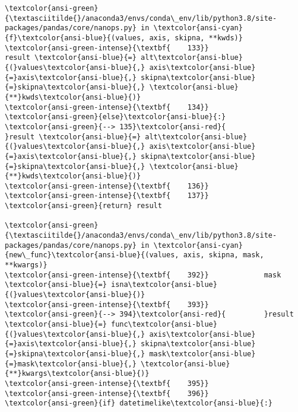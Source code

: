 \documentclass[11pt]{article}
\begin{document}
\begin{Verbatim}[commandchars=\\\{\}, frame=single, framerule=2mm, rulecolor=\color{outerrorbackground}]
\textcolor{ansi-green}{\textasciitilde{}/anaconda3/envs/conda\_env/lib/python3.8/site-packages/pandas/core/nanops.py} in \textcolor{ansi-cyan}{f}\textcolor{ansi-blue}{(values, axis, skipna, **kwds)}
\textcolor{ansi-green-intense}{\textbf{    133}}                     result \textcolor{ansi-blue}{=} alt\textcolor{ansi-blue}{(}values\textcolor{ansi-blue}{,} axis\textcolor{ansi-blue}{=}axis\textcolor{ansi-blue}{,} skipna\textcolor{ansi-blue}{=}skipna\textcolor{ansi-blue}{,} \textcolor{ansi-blue}{**}kwds\textcolor{ansi-blue}{)}
\textcolor{ansi-green-intense}{\textbf{    134}}             \textcolor{ansi-green}{else}\textcolor{ansi-blue}{:}
\textcolor{ansi-green}{--> 135}\textcolor{ansi-red}{                 }result \textcolor{ansi-blue}{=} alt\textcolor{ansi-blue}{(}values\textcolor{ansi-blue}{,} axis\textcolor{ansi-blue}{=}axis\textcolor{ansi-blue}{,} skipna\textcolor{ansi-blue}{=}skipna\textcolor{ansi-blue}{,} \textcolor{ansi-blue}{**}kwds\textcolor{ansi-blue}{)}
\textcolor{ansi-green-intense}{\textbf{    136}} 
\textcolor{ansi-green-intense}{\textbf{    137}}             \textcolor{ansi-green}{return} result

\textcolor{ansi-green}{\textasciitilde{}/anaconda3/envs/conda\_env/lib/python3.8/site-packages/pandas/core/nanops.py} in \textcolor{ansi-cyan}{new\_func}\textcolor{ansi-blue}{(values, axis, skipna, mask, **kwargs)}
\textcolor{ansi-green-intense}{\textbf{    392}}             mask \textcolor{ansi-blue}{=} isna\textcolor{ansi-blue}{(}values\textcolor{ansi-blue}{)}
\textcolor{ansi-green-intense}{\textbf{    393}} 
\textcolor{ansi-green}{--> 394}\textcolor{ansi-red}{         }result \textcolor{ansi-blue}{=} func\textcolor{ansi-blue}{(}values\textcolor{ansi-blue}{,} axis\textcolor{ansi-blue}{=}axis\textcolor{ansi-blue}{,} skipna\textcolor{ansi-blue}{=}skipna\textcolor{ansi-blue}{,} mask\textcolor{ansi-blue}{=}mask\textcolor{ansi-blue}{,} \textcolor{ansi-blue}{**}kwargs\textcolor{ansi-blue}{)}
\textcolor{ansi-green-intense}{\textbf{    395}} 
\textcolor{ansi-green-intense}{\textbf{    396}}         \textcolor{ansi-green}{if} datetimelike\textcolor{ansi-blue}{:}


\end{Verbatim}
\end{document}
